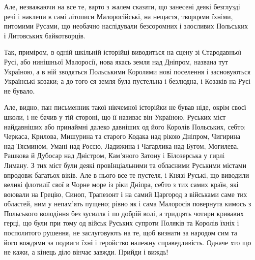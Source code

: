 Але, незважаючи на все те, варто з жалем сказати, що занесені деякі безглузді
речі і наклепи в самі літописи Малоросійські, на нещастя, творцями їхніми,
питомими Русами, що необачно наслідували безсоромних і злосливих Польських і
Литовських байкотворців. 

Так, приміром, в одній шкільній історійці виводиться
на сцену зі Стародавньої Русі, або нинішньої Малоросії, нова якась земля над
Дніпром, названа тут Україною, а в ній зводяться Польськими Королями нові
поселення і засновуються Українські козаки; а до того ся земля була пустельна і
безлюдна, і Козаків на Русі не бувало. 

Але, видно, пан письменник такої нікчемної історійки не бував ніде, окрім своєї
школи, і не бачив у тій стороні, що її називає він Україною, Руських міст
найдавніших або принаймні далеко давніших од його Королів Польських, себто:
Черкаса, Крилова, Мишурина та старого Кодака над рікою Дніпром, Чигирина над
Тясмином, Умані над Россю, Ладижина і Чагарлика над Бугом, Могилева, Рашкова й
Дубосар над Дністром, Кам'яного Затону і Білозерська у гирлі Лиману. З тих міст
були деякі провІнціальними та обласними Руськими містами впродовж багатьох
віків. Але в нього все те пустеля, і Князі Руські, що виводили великі флотилії
свої в Чорне море із ріки Дніпра, себто з тих самих країн, які воювали на
Грецію, Синоп, Трапезонт і на самий Царгород з військами саме тих областей, ним
у непам'ять пущено; рівно як і сама Малоросія повернута кимось з Польського
володіння без зусилля і по добрій волі, а тридцять чотири кривавих герці, що
були при тому од військ Руських супроти Поляків та Королів їхніх і посполитого
рушення, не заслуговують на те, щоб визнати за народом сим та його вождями за
подвиги їхні і геройство належну справедливість. Одначе хто що не кажи, а
кінець діло вінчає завжди. Прийди і виждь!
